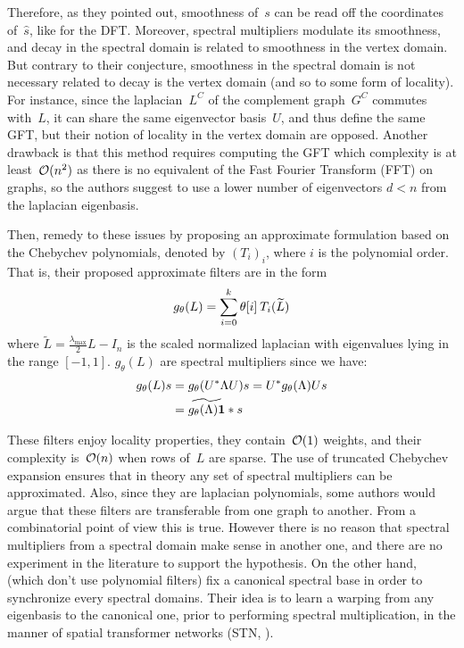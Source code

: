Therefore, as they pointed out, smoothness of~$s$ can be read off the coordinates of~$\hat{s}$, like for the DFT. Moreover, spectral multipliers modulate its smoothness, and decay in the spectral domain is related to smoothness in the vertex domain. But contrary to their conjecture, smoothness in the spectral domain is not necessary related to decay is the vertex domain (and so to some form of locality). For instance, since the laplacian~$L^C$ of the complement graph~$G^C$ commutes with~$L$, it can share the same eigenvector basis~$U$, and thus define the same GFT, but their notion of locality in the vertex domain are opposed. Another drawback is that this method requires computing the GFT which complexity is at least~$\co(n^2)$ as there is no equivalent of the Fast Fourier Transform (FFT) on graphs, so the authors suggest to use a lower number of eigenvectors $d < n$ from the laplacian eigenbasis.

Then, \cite{defferrard2016convolutional} remedy to these issues by proposing an approximate formulation based on the Chebychev polynomials, denoted by $(T_i)_i$, where $i$ is the polynomial order.
That is, their proposed approximate filters are in the form
\begin{gather}
g_\theta(L) = \sum_{i=0}^k \theta[i] \h{2} T_i(\widetilde{L})
\end{gather}
where $\widetilde{L} = \frac{\lambda_{\max}}2L - I_n$ is the scaled normalized laplacian with eigenvalues lying in the range $[-1,1]$. $g_\theta(L)$ are spectral multipliers since we have:
\begin{align}
g_\theta(L)s &= g_\theta(U^*\Lambda U)s
= U^* g_\theta(\Lambda) Us\nonumber\\
&= \widetilde{g_\theta(\Lambda) \textbf1} \ast s
\end{align}

These filters enjoy locality properties, they contain~$\co(1)$ weights, and their complexity is~$\co(n)$ when rows of~$L$ are sparse. The use of truncated Chebychev expansion \citep{hammond2011wavelets} ensures that in theory any set of spectral multipliers can be approximated. Also, since they are laplacian polynomials, some authors would argue that these filters are transferable from one graph to another. From a combinatorial point of view this is true. However there is no reason that spectral multipliers from a spectral domain make sense in another one, and there are no experiment in the literature to support the hypothesis. On the other hand, \citep{yi2016syncspeccnn} (which don't use polynomial filters) fix a canonical spectral base in order to synchronize every spectral domains. Their idea is to learn a warping from any eigenbasis to the canonical one, prior to performing spectral multiplication, in the manner of spatial transformer networks (STN, \cite{jaderberg2015spatial}).

